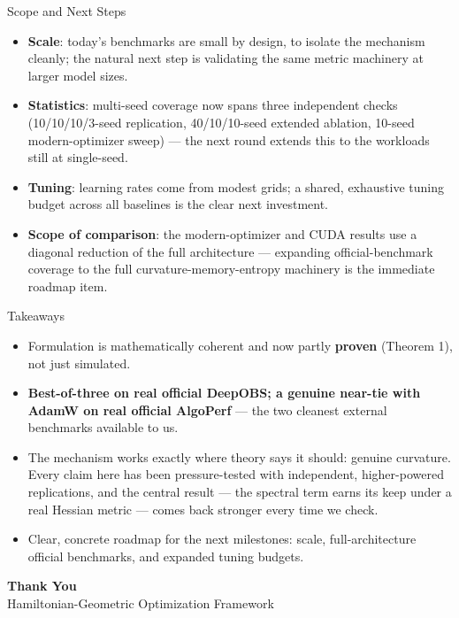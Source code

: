 \documentclass[aspectratio=169,11pt]{beamer}
\begin{document}
\begin{frame}{Scope and Next Steps}
  \begin{itemize}
    \item \textbf{Scale}: today's benchmarks are small by design, to isolate the mechanism
      cleanly; the natural next step is validating the same metric machinery at larger model
      sizes.
    \item \textbf{Statistics}: multi-seed coverage now spans three independent checks
      (10/10/10/3-seed replication, 40/10/10-seed extended ablation, 10-seed modern-optimizer
      sweep) --- the next round extends this to the workloads still at single-seed.
    \item \textbf{Tuning}: learning rates come from modest grids; a shared, exhaustive tuning
      budget across all baselines is the clear next investment.
    \item \textbf{Scope of comparison}: the modern-optimizer and CUDA results use a diagonal
      reduction of the full architecture --- expanding official-benchmark coverage to the full
      curvature-memory-entropy machinery is the immediate roadmap item.
  \end{itemize}
\end{frame}

\begin{frame}{Takeaways}
  \begin{itemize}
    \item Formulation is mathematically coherent and now partly \textbf{proven}
      (Theorem 1), not just simulated.
    \item \textbf{Best-of-three on real official DeepOBS; a genuine near-tie with AdamW on real
      official AlgoPerf} --- the two cleanest external benchmarks available to us.
    \item The mechanism works exactly where theory says it should: genuine curvature. Every
      claim here has been pressure-tested with independent, higher-powered replications, and the
      central result --- the spectral term earns its keep under a real Hessian metric --- comes
      back stronger every time we check.
    \item Clear, concrete roadmap for the next milestones: scale, full-architecture official
      benchmarks, and expanded tuning budgets.
  \end{itemize}
  \vfill
  \centering
  {\Large\textbf{Thank You}}\\
  \small Hamiltonian-Geometric Optimization Framework
\end{frame}
\end{document}
